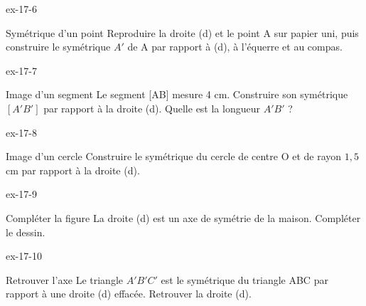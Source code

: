 \begin{blocLivre}{ex-17-6}\begin{exercice}[2]{Symétrique d’un point}
Reproduire la droite (d) et le point A sur papier uni, puis construire le symétrique $A'$ de A par rapport à (d), à l’équerre et au compas.
\label{fig-ex-17-6}
\end{exercice}\end{blocLivre}
\begin{blocLivre}{ex-17-7}\begin{exercice}[2]{Image d’un segment}
Le segment [AB] mesure 4 cm. Construire son symétrique $[A'B']$ par rapport à la droite (d). Quelle est la longueur $A'B'$ ?
\label{fig-ex-17-7}
\end{exercice}\end{blocLivre}
\begin{blocLivre}{ex-17-8}\begin{exercice}[2]{Image d’un cercle}
Construire le symétrique du cercle de centre O et de rayon $1{,}5$ cm par rapport à la droite (d).
\label{fig-ex-17-8}
\end{exercice}\end{blocLivre}
\begin{blocLivre}{ex-17-9}\begin{exercice}[2]{Compléter la figure}
La droite (d) est un axe de symétrie de la maison. Compléter le dessin.
\label{fig-ex-17-9}
\end{exercice}\end{blocLivre}
\begin{blocLivre}{ex-17-10}\begin{exercice}[2]{Retrouver l’axe}
Le triangle $A'B'C'$ est le symétrique du triangle ABC par rapport à une droite (d) effacée. Retrouver la droite (d).
\label{fig-ex-17-10}
\end{exercice}\end{blocLivre}

